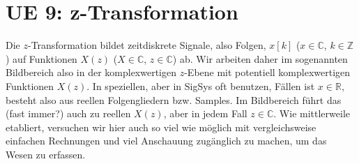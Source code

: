 \clearpage
\section{UE 9: z-Transformation}
%
Die $z$-Transformation bildet zeitdiskrete Signale, also Folgen, $x[k]$
($x\in\mathbb{C}$, $k\in\mathbb{Z}$)
auf Funktionen $X(z)$ ($X\in\mathbb{C}$, $z\in\mathbb{C}$)
ab.
%
Wir arbeiten daher im sogenannten Bildbereich also in der komplexwertigen $z$-Ebene mit
potentiell komplexwertigen Funktionen $X(z)$.
%
In speziellen, aber in SigSys oft benutzen, Fällen ist $x\in\mathbb{R}$, besteht
also aus reellen Folgengliedern bzw. Samples. Im Bildbereich führt das (fast immer?)
auch zu reellen $X(z)$, aber in jedem Fall $z\in\mathbb{C}$.
%
Wie mittlerweile etabliert, versuchen wir hier auch so viel wie möglich mit
vergleichsweise einfachen Rechnungen und viel Anschauung zugänglich zu machen,
um das Wesen zu erfassen.
%



